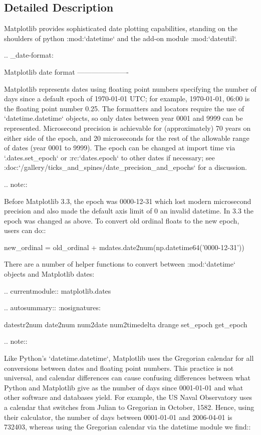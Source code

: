 \subsection{Detailed Description}
\begin{DoxyVerb}Matplotlib provides sophisticated date plotting capabilities, standing on the
shoulders of python :mod:`datetime` and the add-on module :mod:`dateutil`.

.. _date-format:

Matplotlib date format
----------------------

Matplotlib represents dates using floating point numbers specifying the number
of days since a default epoch of 1970-01-01 UTC; for example,
1970-01-01, 06:00 is the floating point number 0.25. The formatters and
locators require the use of `datetime.datetime` objects, so only dates between
year 0001 and 9999 can be represented.  Microsecond precision
is achievable for (approximately) 70 years on either side of the epoch, and
20 microseconds for the rest of the allowable range of dates (year 0001 to
9999). The epoch can be changed at import time via `.dates.set_epoch` or
:rc:`dates.epoch` to other dates if necessary; see
:doc:`/gallery/ticks_and_spines/date_precision_and_epochs` for a discussion.

.. note::

   Before Matplotlib 3.3, the epoch was 0000-12-31 which lost modern
   microsecond precision and also made the default axis limit of 0 an invalid
   datetime.  In 3.3 the epoch was changed as above.  To convert old
   ordinal floats to the new epoch, users can do::

     new_ordinal = old_ordinal + mdates.date2num(np.datetime64('0000-12-31'))


There are a number of helper functions to convert between :mod:`datetime`
objects and Matplotlib dates:

.. currentmodule:: matplotlib.dates

.. autosummary::
   :nosignatures:

   datestr2num
   date2num
   num2date
   num2timedelta
   drange
   set_epoch
   get_epoch

.. note::

   Like Python's `datetime.datetime`, Matplotlib uses the Gregorian calendar
   for all conversions between dates and floating point numbers. This practice
   is not universal, and calendar differences can cause confusing
   differences between what Python and Matplotlib give as the number of days
   since 0001-01-01 and what other software and databases yield.  For
   example, the US Naval Observatory uses a calendar that switches
   from Julian to Gregorian in October, 1582.  Hence, using their
   calculator, the number of days between 0001-01-01 and 2006-04-01 is
   732403, whereas using the Gregorian calendar via the datetime
   module we find::


\end{DoxyVerb}

